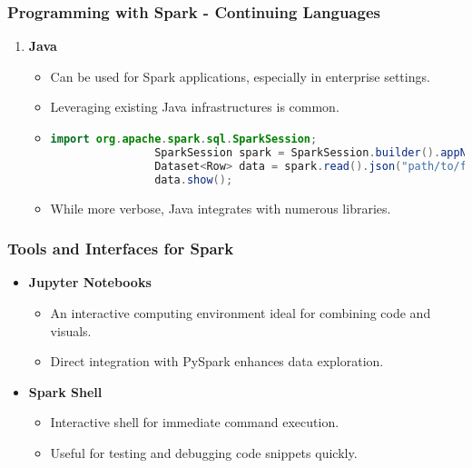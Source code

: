 \documentclass[aspectratio=169]{beamer}
\begin{document}
\begin{frame}[fragile]
    \frametitle{Programming with Spark - Continuing Languages}
    \begin{enumerate}[resume]
        \item \textbf{Java}
            \begin{itemize}
                \item Can be used for Spark applications, especially in enterprise settings.
                \item Leveraging existing Java infrastructures is common.
                \item \begin{lstlisting}[language=java]
                import org.apache.spark.sql.SparkSession;
                SparkSession spark = SparkSession.builder().appName("Example").getOrCreate();
                Dataset<Row> data = spark.read().json("path/to/file.json");
                data.show();
                \end{lstlisting}
                \item While more verbose, Java integrates with numerous libraries.
            \end{itemize}
    \end{enumerate}
\end{frame}

\begin{frame}[fragile]
    \frametitle{Tools and Interfaces for Spark}
    \begin{itemize}
        \item \textbf{Jupyter Notebooks}
            \begin{itemize}
                \item An interactive computing environment ideal for combining code and visuals.
                \item Direct integration with PySpark enhances data exploration.
            \end{itemize}
        \item \textbf{Spark Shell}
            \begin{itemize}
                \item Interactive shell for immediate command execution.
                \item Useful for testing and debugging code snippets quickly.
            \end{itemize}
    \end{itemize}
\end{frame}
\end{document}
